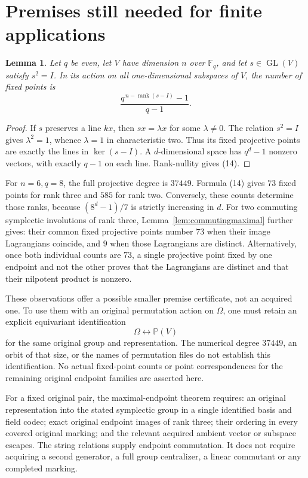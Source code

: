 \documentclass[11pt]{article}
\newtheorem{lemma}[theorem]{Lemma}
\begin{document}
\section{Premises still needed for finite applications}

\begin{lemma}\label{lem:projective}
Let \(q\) be even, let \(V\) have dimension \(n\) over
\(\mathbb F_q\), and let \(s\in\operatorname{GL}(V)\) satisfy
\(s^2=I\). In its action on \emph{all} one-dimensional subspaces
of \(V\), the number of fixed points is
\[
             \frac{q^{\,n-\operatorname{rank}(s-I)}-1}{q-1}.
                                                               \tag{14}
\]
\end{lemma}
\begin{proof}
If \(s\) preserves a line \(kx\), then \(sx=\lambda x\) for
some \(\lambda\ne0\). The relation \(s^2=I\) gives
\(\lambda^2=1\), whence \(\lambda=1\) in characteristic two.
Thus its fixed projective points are exactly the lines in
\(\ker(s-I)\). A \(d\)-dimensional space has \(q^d-1\) nonzero
vectors, with exactly \(q-1\) on each line. Rank-nullity gives
(14).
\end{proof}

For \(n=6,q=8\), the full projective degree is \(37449\).
Formula (14) gives \(73\) fixed points for rank three and
\(585\) for rank two. Conversely, these counts determine those
ranks, because \((8^d-1)/7\) is strictly increasing in \(d\).
For two commuting symplectic involutions of rank three,
Lemma~\ref{lem:commutingmaximal} further gives:
their common fixed projective points number \(73\) when their
image Lagrangians coincide, and \(9\) when those Lagrangians
are distinct.
Alternatively, once both individual counts are \(73\), a single
projective point fixed by one endpoint and not the other proves
that the Lagrangians are distinct and that their nilpotent product
is nonzero.

These observations offer a possible smaller premise certificate,
not an acquired one. To use them with an original permutation
action on \(\Omega\), one must retain an explicit equivariant
identification
\[
                      \Omega\longleftrightarrow\mathbb P(V)
\]
for the same original group and representation.
The numerical degree \(37449\), an orbit of that size, or the
names of permutation files do not establish this identification.
No actual fixed-point counts or point correspondences for the
remaining original endpoint families are asserted here.

For a fixed original pair, the maximal-endpoint theorem requires:
an original representation into the stated symplectic group in a
single identified basis and field codec; exact original endpoint
images of rank three; their ordering in every covered original
marking; and the relevant acquired ambient vector or subspace escapes.
The string relations supply endpoint commutation.
It does not require acquiring a second generator, a full group
centralizer, a linear commutant or any completed marking.
\end{document}
